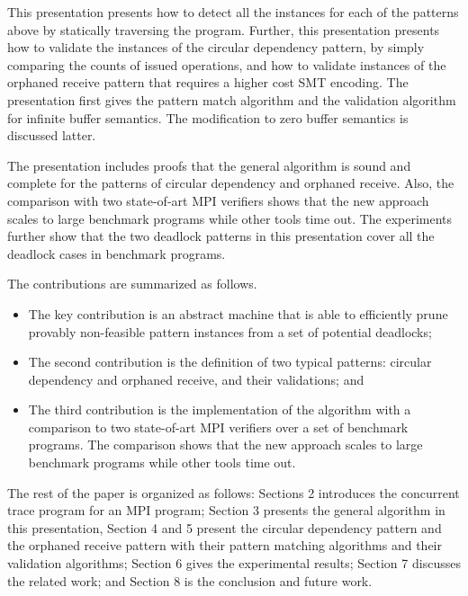 This presentation presents how to detect all the instances for each of the patterns above by statically traversing the program. Further, this presentation presents how to validate the instances of the circular dependency pattern, by simply comparing the counts of issued operations, and how to validate instances of the orphaned receive pattern that requires a higher cost SMT encoding. The presentation first gives the pattern match algorithm and the validation algorithm for infinite buffer semantics. The modification to zero buffer semantics is discussed latter.  

The presentation includes proofs that the general algorithm is sound and complete for the patterns of circular dependency and orphaned receive. Also, the comparison with two state-of-art MPI verifiers shows that the new approach scales to large benchmark programs while other tools time out. The experiments further show that the two deadlock patterns in this presentation cover all the deadlock cases in benchmark programs.


The contributions are summarized as follows.
\begin{itemize}
\item The key contribution is an abstract machine that is able to efficiently prune provably non-feasible pattern instances from a set of potential deadlocks; 
\item The second contribution is the definition of two typical patterns: circular dependency and orphaned receive, and their validations; and
\item The third contribution is the implementation of the algorithm with a comparison to two state-of-art MPI verifiers over a set of benchmark programs. The comparison shows that the new approach scales to large benchmark programs while other tools time out.
\end{itemize}


The rest of the paper is organized as follows: Sections 2 introduces the concurrent trace program for an MPI program; Section 3 presents the general algorithm in this presentation, Section 4 and 5 present the circular dependency pattern and the orphaned receive pattern with their pattern matching algorithms and their validation algorithms; Section 6 gives the experimental results; Section 7 discusses the related work; and Section 8 is the conclusion and future work.